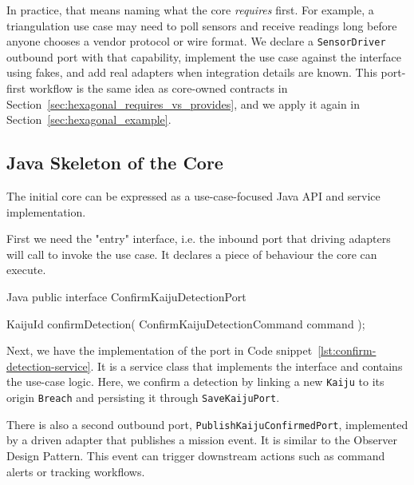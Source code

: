 In practice, that means naming what the core \textit{requires} first. For example, a triangulation use case may need to poll sensors and receive readings long before anyone chooses a vendor protocol or wire format. We declare a \texttt{SensorDriver} outbound port with that capability, implement the use case against the interface using fakes, and add real adapters when integration details are known. This port-first workflow is the same idea as core-owned contracts in Section~\ref{sec:hexagonal_requires_vs_provides}, and we apply it again in Section~\ref{sec:hexagonal_example}.

\subsection{Java Skeleton of the Core}
\label{sec:hexagonal_java_core_skeleton}

The initial core can be expressed as a use-case-focused Java API and service implementation.

First we need the "entry" interface, i.e. the inbound port that driving adapters will call to invoke the use case. It declares a piece of behaviour the core can execute.

\begin{ridercode}{Java}
public interface ConfirmKaijuDetectionPort
{

    KaijuId confirmDetection(
        ConfirmKaijuDetectionCommand command
    );

}
\end{ridercode}
\label{lst:confirm-detection-port}

Next, we have the implementation of the port in Code snippet~\ref{lst:confirm-detection-service}. It is a service class that implements the interface and contains the use-case logic. Here, we confirm a detection by linking a new \texttt{Kaiju} to its origin \texttt{Breach} and persisting it through \texttt{SaveKaijuPort}.

There is also a second outbound port, \texttt{PublishKaijuConfirmedPort}, implemented by a driven adapter that publishes a mission event. It is similar to the Observer Design Pattern. This event can trigger downstream actions such as command alerts or tracking workflows.

